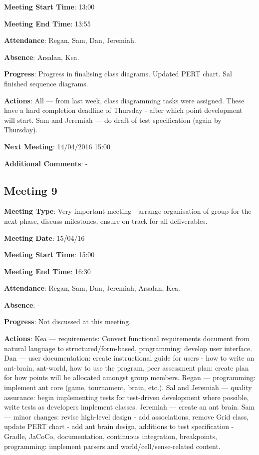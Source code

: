 \documentclass[11pt]{article}
\begin{document}
\textbf{Meeting Start Time}: 13:00

\textbf{Meeting End Time}: 13:55

\textbf{Attendance}: Regan, Sam, Dan, Jeremiah.

\textbf{Absence}: Arsalan, Kea.

\textbf{Progress}: Progress in finalising class diagrams. Updated PERT chart. Sal finished sequence diagrams.

\textbf{Actions}: All --- from last week, class diagramming tasks were assigned. These have a hard completion deadline of Thursday - after which point development will start. Sam and Jeremiah --- do draft of test specification (again by Thursday).

\textbf{Next Meeting}: 14/04/2016 15:00

\textbf{Additional Comments}: -

\subsection{Meeting 9}

\textbf{Meeting Type}: Very important meeting - arrange organisation of group for the next phase, discuss milestones, ensure on track for all deliverables.

\textbf{Meeting Date}: 15/04/16

\textbf{Meeting Start Time}: 15:00

\textbf{Meeting End Time}: 16:30

\textbf{Attendance}: Regan, Sam, Dan, Jeremiah, Arsalan, Kea.

\textbf{Absence}: -

\textbf{Progress}: Not discussed at this meeting.

\textbf{Actions}: Kea --- requirements: Convert functional requirements document from natural language to structured/form-based, programming: develop user interface. Dan --- user documentation: create instructional guide for users - how to write an ant-brain, ant-world, how to use the program, peer assessment plan: create plan for how points will be allocated amongst group members. Regan --- programming: implement ant core (game, tournament, brain, etc.). Sal and Jeremiah --- quality assurance: begin implementing tests for test-driven development where possible, write tests as developers implement classes. Jeremiah --- create an ant brain. Sam --- minor changes: revise high-level design - add associations, remove Grid class, update PERT chart - add ant brain design, additions to test specification - Gradle, JaCoCo, documentation, continuous integration, breakpoints, programming: implement parsers and world/cell/sense-related content.
\end{document}

